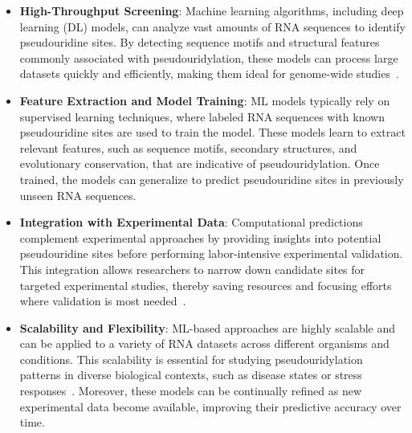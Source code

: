     \begin{itemize}
      \item \textbf{High-Throughput Screening}: Machine learning algorithms, including deep learning (DL) models, can analyze vast amounts of RNA sequences to identify pseudouridine sites. By detecting sequence motifs and structural features commonly associated with pseudouridylation, these models can process large datasets quickly and efficiently, making them ideal for genome-wide studies~\cite{he2021pseudornaseeker}.
      \item \textbf{Feature Extraction and Model Training}: ML models typically rely on supervised learning techniques, where labeled RNA sequences with known pseudouridine sites are used to train the model. These models learn to extract relevant features, such as sequence motifs, secondary structures, and evolutionary conservation, that are indicative of pseudouridylation. Once trained, the models can generalize to predict pseudouridine sites in previously unseen RNA sequences.
      \item \textbf{Integration with Experimental Data}: Computational predictions complement experimental approaches by providing insights into potential pseudouridine sites before performing labor-intensive experimental validation. This integration allows researchers to narrow down candidate sites for targeted experimental studies, thereby saving resources and focusing efforts where validation is most needed~\cite{song2020identification}.
      \item \textbf{Scalability and Flexibility}: ML-based approaches are highly scalable and can be applied to a variety of RNA datasets across different organisms and conditions. This scalability is essential for studying pseudouridylation patterns in diverse biological contexts, such as disease states or stress responses~\cite{he2021pseudornaseeker}. Moreover, these models can be continually refined as new experimental data become available, improving their predictive accuracy over time.
    \end{itemize}
